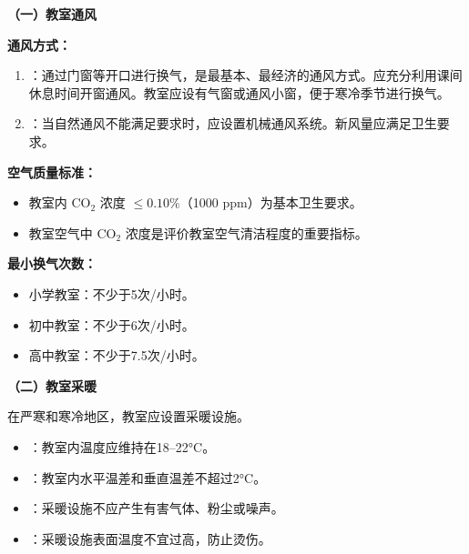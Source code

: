 \begin{keybox}
\textbf{（一）教室通风}

\textbf{通风方式：}

\begin{enumerate}[leftmargin=*]
    \item {}：通过门窗等开口进行换气，是最基本、最经济的通风方式。应充分利用课间休息时间开窗通风。教室应设有气窗或通风小窗，便于寒冷季节进行换气。
    \item {}：当自然通风不能满足要求时，应设置机械通风系统。新风量应满足卫生要求。
\end{enumerate}

\textbf{空气质量标准：}

\begin{itemize}[leftmargin=*]
    \item 教室内 $\mathrm{CO}_2$ 浓度 $\leq 0.10\%$（1000 ppm）为基本卫生要求。
    \item 教室空气中 $\mathrm{CO}_2$ 浓度是评价教室空气清洁程度的重要指标。
\end{itemize}

\textbf{最小换气次数：}

\begin{itemize}[leftmargin=*]
    \item 小学教室：不少于5次/小时。
    \item 初中教室：不少于6次/小时。
    \item 高中教室：不少于7.5次/小时。
\end{itemize}

\textbf{（二）教室采暖}

在严寒和寒冷地区，教室应设置采暖设施。

\begin{itemize}[leftmargin=*]
    \item {}：教室内温度应维持在18--22°C。
    \item {}：教室内水平温差和垂直温差不超过2°C。
    \item {}：采暖设施不应产生有害气体、粉尘或噪声。
    \item {}：采暖设施表面温度不宜过高，防止烫伤。
\end{itemize}
\end{keybox}


